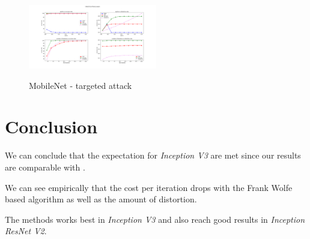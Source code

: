 \documentclass[10pt,twocolumn,letterpaper, english]{article}
\theoremstyle{definition}
\theoremstyle{plain}
\theoremstyle{plain}
\theoremstyle{plain}
\theoremstyle{plain}
\theoremstyle{remark}
\theoremstyle{remark}
\theoremstyle{definition}
\theoremstyle{definition}
\theoremstyle{definition}
\theoremstyle{definition}
\begin{document}
\begin{figure}[H]
  \centering
  \includegraphics[width=0.5\textwidth]{report_template/Images/Mobile_Grid_Targeted.png}\\
  \caption{MobileNet - targeted attack } \label{mob-t}
\end{figure}


\section{Conclusion}

We can conclude that the expectation for \textit{Inception V3} are met since our results are comparable with \cite{frank}.

We can see empirically that the cost per iteration drops with the Frank Wolfe based algorithm as well as the amount of distortion.

The methods works best in \textit{Inception V3} and also reach good results in \textit{Inception ResNet V2}.



{\small


}









\end{document}
